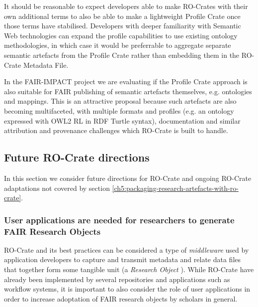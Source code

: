 It should be reasonable to expect developers able to make RO-Crates with their own additional terms to also be able to make a lightweight Profile Crate once those terms have stabilised. Developers with deeper familiarity with Semantic Web technologies can expand the profile capabilities to use existing ontology methodologies, in which case it would be preferrable to aggregate separate semantic artefacts from the Profile Crate rather than embedding them in the RO-Crate Metadata File.

In the FAIR-IMPACT project we are evaluating if the Profile Crate approach is also suitable for FAIR publishing of semantic artefacts themselves, e.g. ontologies and mappings. This is an attractive proposal because such artefacts are also becoming multifaceted, with multiple formats and profiles (e.g. an ontology expressed with OWL2 RL in RDF Turtle syntax), documentation and similar attribution and provenance challenges which RO-Crate is built to handle.

\subsection{Future RO-Crate directions}
\label{ch61:rocratefuture}
In this section we consider future directions for RO-Crate and ongoing RO-Crate adaptations not covered by section \ref{ch5:packaging-research-artefacts-with-ro-crate}.


\subsubsection{User applications are needed for researchers to generate FAIR Research Objects}
\label{ch61:applications}

RO-Crate and its best practices can be considered a type of \emph{middleware} used by application developers to capture and transmit metadata and relate data files that together form some tangible unit (a \emph{Research Object} \cite{Bechhofer 2013}). While RO-Crate have already been implemented by several repositories and applications such as workflow systems, it is important to also consider the role of user applications in order to increase adoptation of FAIR research objects by scholars in general.

